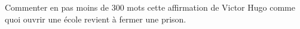 
\begin{exercice}\label{exosmath-0456}

    Commenter en pas moins de \( 300\) mots cette affirmation de Victor Hugo comme quoi ouvrir une école revient à fermer une prison.

\end{exercice}
